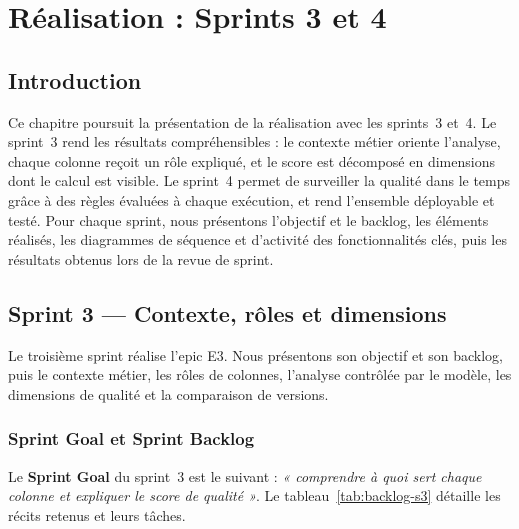 \chapter{Réalisation : Sprints 3 et 4}

\section*{Introduction}
Ce chapitre poursuit la présentation de la réalisation avec les sprints~3 et~4. Le sprint~3 rend les résultats compréhensibles : le contexte métier oriente l'analyse, chaque colonne reçoit un rôle expliqué, et le score est décomposé en dimensions dont le calcul est visible. Le sprint~4 permet de surveiller la qualité dans le temps grâce à des règles évaluées à chaque exécution, et rend l'ensemble déployable et testé. Pour chaque sprint, nous présentons l'objectif et le backlog, les éléments réalisés, les diagrammes de séquence et d'activité des fonctionnalités clés, puis les résultats obtenus lors de la revue de sprint.

\section{Sprint 3 — Contexte, rôles et dimensions}

Le troisième sprint réalise l'epic E3. Nous présentons son objectif et son backlog, puis le contexte métier, les rôles de colonnes, l'analyse contrôlée par le modèle, les dimensions de qualité et la comparaison de versions.

\subsection{Sprint Goal et Sprint Backlog}

Le \textbf{Sprint Goal} du sprint~3 est le suivant : \textit{« comprendre à quoi sert chaque colonne et expliquer le score de qualité »}. Le tableau~\ref{tab:backlog-s3} détaille les récits retenus et leurs tâches.


